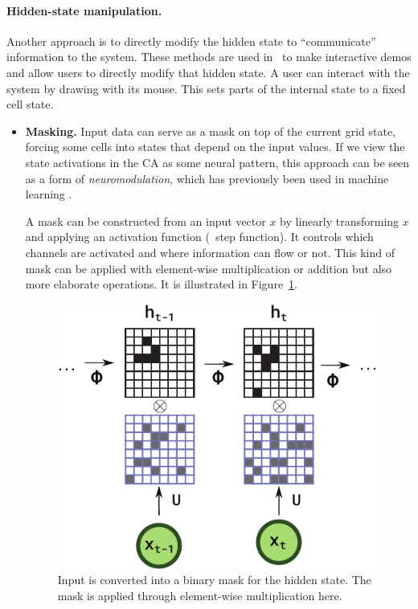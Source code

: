 \paragraph{Hidden-state manipulation.}
Another approach is to directly modify the hidden state to ``communicate''
information to the system. These methods are used
in~\parencite{mordvintsevGrowingNeuralCellular2020,
  randazzoSelfclassifyingMNISTDigits2020} to make interactive demos and allow
users to directly modify that hidden state. A user can interact with the system
by drawing with its mouse. This sets parts of the internal state to a fixed cell
state.

\begin{itemize}
  \item \textbf{Masking.} Input data can serve as a mask on top of the current
        grid state, forcing some cells into states that depend on the input
        values. If we view the state activations in the CA as some neural
        pattern, this approach can be seen as a form of \emph{neuromodulation},
        which has previously been used in machine learning
        \parencite{soltoggioEvolutionaryAdvantagesNeuromodulated2008,
        ishiguroNeuromodulatedControlBipedal2003,
        beaulieuLearningContinuallyLearn2020}.

        A mask can be constructed from an input vector $x$ by linearly
        transforming $x$ and applying an activation function (\eg~step
        function). It controls which channels are activated and where
        information can flow or not. This kind of mask can be applied with
        element-wise multiplication or addition but also more elaborate
        operations. It is illustrated in Figure~\ref{fig:mask}.

\begin{figure}[ht]
  \centering
  \includegraphics[width=.5\linewidth]{figures/mask.pdf}
  \caption{\label{fig:mask} Input is converted into a binary mask for the hidden
    state. The mask is applied through element-wise multiplication here.}
\end{figure}

\end{itemize}

